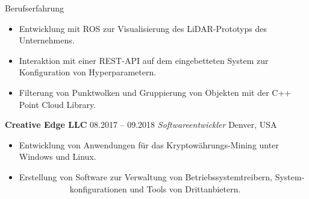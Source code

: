 \begin{rubric}{Berufserfahrung}
\vspace{\CVItemizeHeaderSpacing} \begin{itemize}[leftmargin=*, rightmargin=1cm]
	\setlength{\itemsep}{\CVItemizeSpacing}  
	\item Entwicklung mit ROS zur Visualisierung des LiDAR-Prototyps des Unternehmens.  
	\item Interaktion mit einer REST-API auf dem eingebetteten System zur Konfiguration von Hyperparametern.  
	\item Filterung von Punktwolken und Gruppierung von Objekten mit der C++ Point Cloud Library.  
\end{itemize}
%
%
\entry*[] \textbf{Creative Edge LLC} \hfill 08.2017 -- 09.2018 \newline  
 \emph{Softwareentwickler} \hfill Denver, USA \newline  
\vspace{\CVItemizeHeaderSpacing} \begin{itemize}[leftmargin=*, rightmargin=1cm] 
	\setlength{\itemsep}{\CVItemizeSpacing}  
	\item Entwicklung von Anwendungen für das Kryptowährungs-Mining unter Windows und Linux.  
	\item Erstellung von Software zur Verwaltung von Betriebssystemtreibern,  System- ~~~~~~~~~~~~konfigurationen und Tools von Drittanbietern.  
\end{itemize}

\end{rubric}

